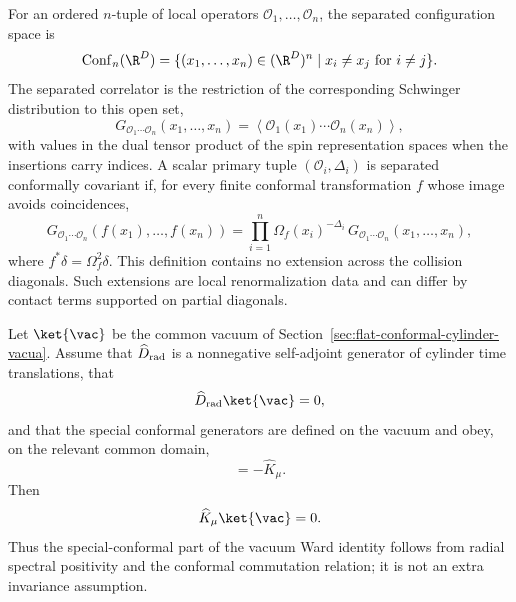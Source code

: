 \begin{definition}
\label{def:separated-euclidean-cft-correlator}
For an ordered \(n\)-tuple of local operators
\(\mathcal O_1,\ldots,\mathcal O_n\), the separated configuration space is
\[
  \operatorname{Conf}_n(\R^D)
  =
  \{(x_1,\ldots,x_n)\in(\R^D)^n\mid x_i\ne x_j\text{ for }i\ne j\}.
\]
The separated correlator is the restriction of the corresponding
Schwinger distribution to this open set,
\[
  G_{\mathcal O_1\cdots\mathcal O_n}(x_1,\ldots,x_n)
  =
  \left\langle
    \mathcal O_1(x_1)\cdots\mathcal O_n(x_n)
  \right\rangle,
\]
with values in the dual tensor product of the spin representation spaces when
the insertions carry indices.  A scalar primary tuple
\((\mathcal O_i,\Delta_i)\) is separated conformally covariant if, for every
finite conformal transformation \(f\) whose image avoids coincidences,
\begin{equation}
  G_{\mathcal O_1\cdots\mathcal O_n}(f(x_1),\ldots,f(x_n))
  =
  \prod_{i=1}^n \Omega_f(x_i)^{-\Delta_i}\,
  G_{\mathcal O_1\cdots\mathcal O_n}(x_1,\ldots,x_n),
  \label{eq:separated-scalar-correlator-covariance}
\end{equation}
where \(f^*\delta=\Omega_f^2\delta\).  This definition contains no extension
across the collision diagonals.  Such extensions are local renormalization
data and can differ by contact terms supported on partial diagonals.
\end{definition}

\begin{lemma}
\label{lem:vacuum-k-invariance-from-radial-spectrum}
Let \(\ket{\vac}\) be the common vacuum of
Section~\ref{sec:flat-conformal-cylinder-vacua}.  Assume that
\(\widehat D_{\rm rad}\) is a nonnegative self-adjoint generator of cylinder
time translations, that
\[
  \widehat D_{\rm rad}\ket{\vac}=0,
\]
and that the special conformal generators are defined on the vacuum and obey,
on the relevant common domain,
\begin{equation}
  [\widehat D_{\rm rad},\widehat K_\mu]=-\widehat K_\mu .
  \label{eq:radial-d-k-vacuum-commutator}
\end{equation}
Then
\[
  \widehat K_\mu\ket{\vac}=0 .
\]
Thus the special-conformal part of the vacuum Ward identity follows from
radial spectral positivity and the conformal commutation relation; it is not an
extra invariance assumption.
\end{lemma}

